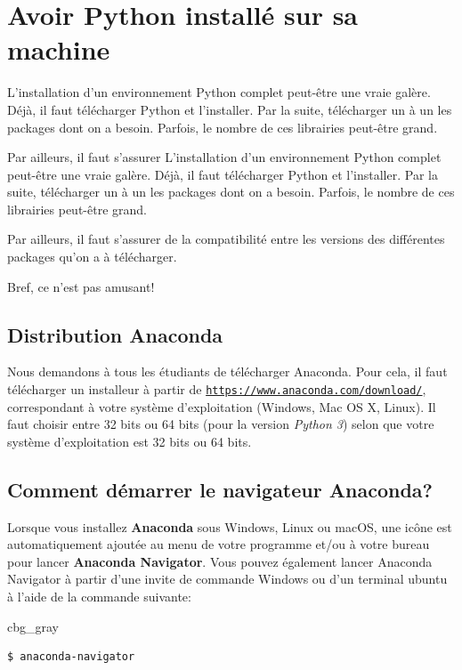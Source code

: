 \documentclass[%
oneside,                 %
final,                   %
10pt,french]{article}
\newenvironment{_cod_tight}[1]{
   \def\FrameCommand{\colorbox{#1}}
   \FrameRule0.6pt\MakeFramed {\FrameRestore}\vskip3mm}
   {\vskip0mm\endMakeFramed}
\newenvironment{cod}[1]{
\bgroup\rmfamily
\fboxsep=0mm\relax
\begin{_cod_tight}{#1}
\list{}{\parsep=-2mm\parskip=0mm\topsep=0pt\leftmargin=2mm
\rightmargin=2\leftmargin\leftmargin=4pt\relax}
\item\relax}
{\endlist\end{_cod_tight}\egroup}
\begin{document}
\noindent
\section{Avoir Python installé sur sa machine}
L’installation d’un environnement Python complet peut-être une vraie galère. Déjà, il faut télécharger Python et l’installer. Par la suite, télécharger un à un les packages dont on a besoin. Parfois, le nombre de ces librairies peut-être grand.

Par ailleurs, il faut s’assurer L’installation d’un environnement Python complet peut-être une vraie galère. Déjà, il faut télécharger Python et l’installer. Par la suite, télécharger un à un les packages dont on a besoin. Parfois, le nombre de ces librairies peut-être grand.

Par ailleurs, il faut s’assurer de la compatibilité entre les versions des différentes packages qu’on a à télécharger.

Bref, ce n’est pas amusant!


\subsection{Distribution Anaconda}
Nous demandons à tous les étudiants de télécharger Anaconda. Pour cela, il faut télécharger un installeur à partir de \href{{https://www.anaconda.com/download/}}{\nolinkurl{https://www.anaconda.com/download/}}, correspondant à votre système d’exploitation (Windows, Mac OS X, Linux). Il faut choisir entre 32 bits ou 64 bits (pour la version \emph{Python 3}) selon que votre système d’exploitation est 32 bits ou 64 bits.

\subsection{Comment démarrer le navigateur Anaconda?}
Lorsque vous installez \textbf{Anaconda} sous Windows, Linux ou macOS, une icône est automatiquement ajoutée au menu de votre programme et/ou à votre bureau pour lancer \textbf{Anaconda Navigator}.
Vous pouvez également lancer Anaconda Navigator à partir d'une invite de commande Windows ou d'un terminal ubuntu  à l'aide de la commande suivante:
\begin{cod}{cbg_gray}\begin{verbatim}
$ anaconda-navigator
\end{verbatim}
\end{cod}
\noindent
\end{document}

